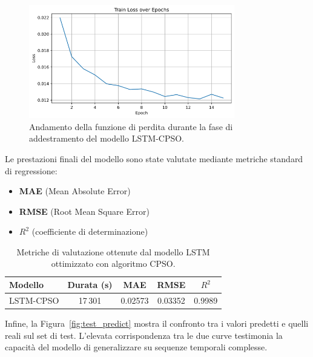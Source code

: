 \documentclass{article}
\begin{document}
\begin{figure}[H]
    \centering
    \includegraphics[width=0.8\textwidth]{img/Train Loss.png}
    \caption{Andamento della funzione di perdita durante la fase di addestramento del modello LSTM-CPSO.}
    \label{fig:train_loss}
\end{figure}

Le prestazioni finali del modello sono state valutate mediante metriche standard di regressione:

\vspace{0.5em}
\begin{itemize}
    \item \textbf{MAE} (Mean Absolute Error)
    \item \textbf{RMSE} (Root Mean Square Error)
    \item \textbf{$R^2$} (coefficiente di determinazione)
\end{itemize}
\vspace{0.5em}

\begin{table}[H]
    \centering
    \renewcommand{\arraystretch}{1.2}
    \begin{tabular}{lcccc}
        \toprule
        \textbf{Modello} & \textbf{Durata (s)} & \textbf{MAE} & \textbf{RMSE} & \boldmath$R^2$ \\
        \midrule
        LSTM-CPSO & 17\,301 & 0.02573 & 0.03352 & 0.9989 \\
        \bottomrule
    \end{tabular}
    \caption{Metriche di valutazione ottenute dal modello LSTM ottimizzato con algoritmo CPSO.}
    \label{tab:Result_LSTM_CPSO}
\end{table}

Infine, la Figura~\ref{fig:test_predict} mostra il confronto tra i valori predetti e quelli reali 
sul set di test. L’elevata corrispondenza tra le due curve testimonia la capacità del modello di 
generalizzare su sequenze temporali complesse.
\end{document}
